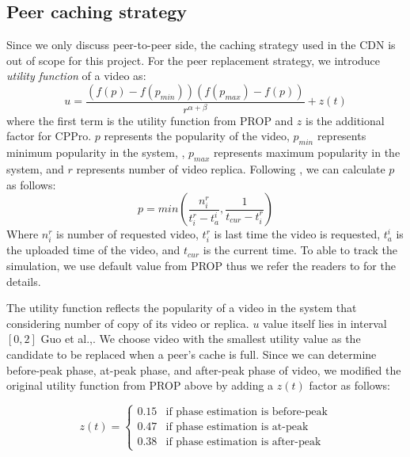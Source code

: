 \documentclass[10pt,final,journal,a4paper]{IEEEtran}
\begin{document}
\subsection{Peer caching strategy}\label{peercachingstrategy}
Since we only discuss peer-to-peer side, the caching strategy used in the CDN is out of scope for this project. 
For the peer replacement strategy, we introduce \textit{utility function} of a video as:
\begin{equation}
u = \frac{ (f(p) - f(p_{min})) (f(p_{max}) - f(p)) }{r^{\alpha + \beta}} + z(t)
\end{equation}
where the first term is the utility function from PROP and $z$ is the additional factor for CPPro. 
$p$ represents the popularity of the video, $p_{min}$ represents minimum popularity in the system, , $p_{max}$ represents maximum popularity in the system, and $r$ represents number of video replica.
Following \cite{1613869}, we can calculate $p$ as follows:
\begin{equation}
p = min \left(\frac{n_i^r}{t_i^r - t_a^i}  , \frac{1}{t_{cur} - t_i^r}\right)
\end{equation}
Where $n_i^r$ is number of requested video, $t_i^r$ is last time the video is requested, $t_a^i$ is the uploaded time of the video, and $t_{cur}$ is the current time.
To able to track the simulation, we use default value from PROP thus we refer the readers to \cite{1613869} for the details.

The utility function reflects the popularity of a video in the system that considering number of copy of its video or replica. 
$u$ value itself lies in interval $[0,2]$ Guo et al.,\cite{1613869}.
We choose video with the smallest utility value as the candidate to be replaced when a peer's cache is full.
Since we can determine before-peak phase, at-peak phase, and after-peak phase of video, we modified the original utility function from PROP above by adding a $z(t)$ factor as follows:

\begin{equation}
 z(t) = 
  \begin{cases}
   0.15 & \text{if phase estimation is before-peak} \\
   0.47 & \text{if phase estimation is at-peak} \\
   0.38 & \text{if phase estimation is after-peak}
  \end{cases}
\end{equation}\label{eq:zfactor}
\end{document}
